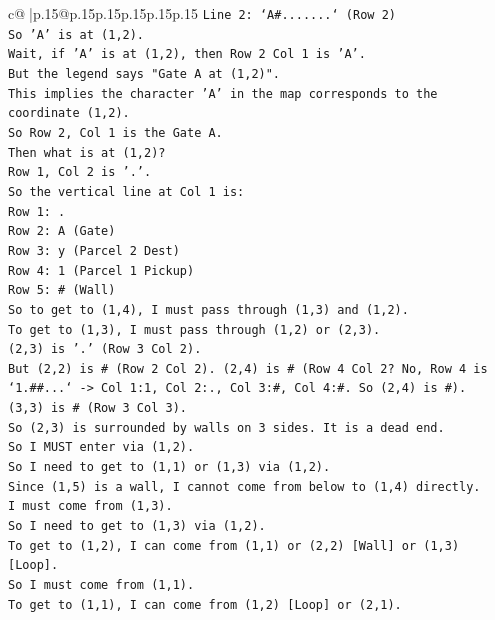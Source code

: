 \documentclass{article}
\begin{document}
{\begin{supertabular}{c@{$\;$}|p{.15\linewidth}@{}p{.15\linewidth}p{.15\linewidth}p{.15\linewidth}p{.15\linewidth}p{.15\linewidth}}
{{{\texttt{Line 2: `A\#.......` (Row 2)} \\
\texttt{So 'A' is at (1,2).} \\
\texttt{Wait, if 'A' is at (1,2), then Row 2 Col 1 is 'A'.} \\
\texttt{But the legend says "Gate A at (1,2)".} \\
\texttt{This implies the character 'A' in the map corresponds to the coordinate (1,2).} \\
\texttt{So Row 2, Col 1 is the Gate A.} \\
\texttt{Then what is at (1,2)?} \\
\texttt{Row 1, Col 2 is '.'.} \\
\texttt{So the vertical line at Col 1 is:} \\
\texttt{Row 1: .} \\
\texttt{Row 2: A (Gate)} \\
\texttt{Row 3: y (Parcel 2 Dest)} \\
\texttt{Row 4: 1 (Parcel 1 Pickup)} \\
\texttt{Row 5: \# (Wall)} \\
\texttt{So to get to (1,4), I must pass through (1,3) and (1,2).} \\
\texttt{To get to (1,3), I must pass through (1,2) or (2,3).} \\
\texttt{(2,3) is '.' (Row 3 Col 2).} \\
\texttt{But (2,2) is \# (Row 2 Col 2). (2,4) is \# (Row 4 Col 2? No, Row 4 is `1.\#\#...` {-}> Col 1:1, Col 2:., Col 3:\#, Col 4:\#. So (2,4) is \#).} \\
\texttt{(3,3) is \# (Row 3 Col 3).} \\
\texttt{So (2,3) is surrounded by walls on 3 sides. It is a dead end.} \\
\texttt{So I MUST enter via (1,2).} \\
\texttt{So I need to get to (1,1) or (1,3) via (1,2).} \\
\texttt{Since (1,5) is a wall, I cannot come from below to (1,4) directly.} \\
\texttt{I must come from (1,3).} \\
\texttt{So I need to get to (1,3) via (1,2).} \\
\texttt{To get to (1,2), I can come from (1,1) or (2,2) {[}Wall{]} or (1,3) {[}Loop{]}.} \\
\texttt{So I must come from (1,1).} \\
\texttt{To get to (1,1), I can come from (1,2) {[}Loop{]} or (2,1).} \\
}}}
\end{supertabular}}
\end{document}
